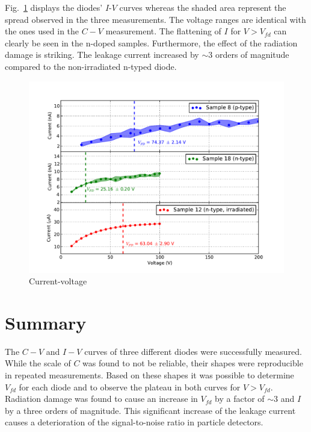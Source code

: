 \documentclass[11pt]{article}
\begin{document}
Fig.~\ref{fig:iv} displays the diodes' $I$-$V$ curves whereas the shaded area represent the spread observed in the three measurements.
The voltage ranges are identical with the ones used in the $C-V$ measurement.
The flattening of $I$ for $V>V_{fd}$ can clearly be seen in the n-doped samples.
Furthermore, the effect of the radiation damage is striking.
The leakage current increased by $\sim 3$ orders of magnitude compared to the non-irradiated n-typed diode.

\begin{figure}
  \centering
  \includegraphics[width=\textwidth]{./figures/iv.pdf}
  \caption{Current-voltage}
  \label{fig:iv}
\end{figure}

\section{Summary}
\label{sec:summary}
The $C-V$ and $I-V$ curves of three different diodes were successfully measured.
While the scale of $C$ was found to not be reliable, their shapes were reproducible in repeated measurements.
Based on these shapes it was possible to determine $V_{fd}$ for each diode and to observe the plateau in both curves for $V>V_{fd}$.
Radiation damage was found to cause an increase in $V_{fd}$ by a factor of $\sim 3$ and $I$ by a three orders of magnitude.
This significant increase of the leakage current causes a deterioration of the signal-to-noise ratio in particle detectors.

\printbibliography
\end{document}
